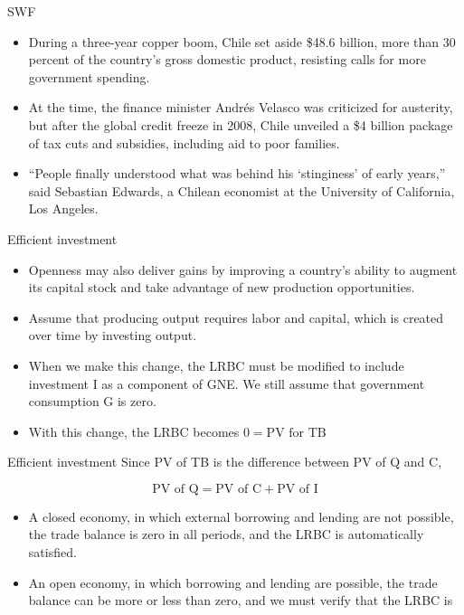 \documentclass[
  ignorenonframetext,
]{beamer}
\begin{document}
\begin{frame}{SWF}
\label{swf}
\begin{itemize}
\item
  During a three-year copper boom, Chile set aside \$48.6 billion, more
  than 30 percent of the country's gross domestic product, resisting
  calls for more government spending.
\item
  At the time, the finance minister Andrés Velasco was criticized for
  austerity, but after the global credit freeze in 2008, Chile unveiled
  a \$4 billion package of tax cuts and subsidies, including aid to poor
  families.
\item
  ``People finally understood what was behind his `stinginess' of early
  years,'' said Sebastian Edwards, a Chilean economist at the University
  of California, Los Angeles.
\end{itemize}
\end{frame}

\begin{frame}{Efficient investment}
\label{efficient-investment}
\begin{itemize}
\item
  Openness may also deliver gains by improving a country's ability to
  augment its capital stock and take advantage of new production
  opportunities.
\item
  Assume that producing output requires labor and capital, which is
  created over time by investing output.
\item
  When we make this change, the LRBC must be modified to include
  investment I as a component of GNE. We still assume that government
  consumption G is zero.
\item
  With this change, the LRBC becomes \(0=\text{PV for TB}\)
\end{itemize}
\end{frame}

\begin{frame}{Efficient investment}
\label{efficient-investment-1}
Since PV of TB is the difference between PV of Q and C,

\[
\text{PV of Q}=\text{PV of C}+\text{PV of I}
\]

\begin{itemize}
\item
  A closed economy, in which external borrowing and lending are not
  possible, the trade balance is zero in all periods, and the LRBC is
  automatically satisfied.
\item
  An open economy, in which borrowing and lending are possible, the
  trade balance can be more or less than zero, and we must verify that
  the LRBC is
\end{itemize}
\end{frame}
\end{document}
